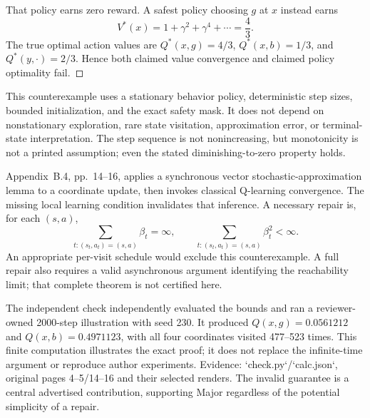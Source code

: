 \documentclass[10pt]{article}
\begin{document}
That policy earns zero reward. A safest policy choosing \(g\) at \(x\) instead earns \[V^*(x)=1+\gamma^2+\gamma^4+\cdots=\frac43.\] The true optimal action values are \(Q^*(x,g)=4/3\), \(Q^*(x,b)=1/3\), and \(Q^*(y,\cdot)=2/3\). Hence both claimed value convergence and claimed policy optimality fail. ◻\par
This counterexample uses a stationary behavior policy, deterministic step sizes, bounded initialization, and the exact safety mask. It does not depend on nonstationary exploration, rare state visitation, approximation error, or terminal-state interpretation. The step sequence is not nonincreasing, but monotonicity is not a printed assumption; even the stated diminishing-to-zero property holds.\par
Appendix B.4, pp. 14–16, applies a synchronous vector stochastic-approximation lemma to a coordinate update, then invokes classical Q-learning convergence. The missing local learning condition invalidates that inference. A necessary repair is, for each \((s,a)\), \[\sum_{t:(s_t,a_t)=(s,a)}\beta_t=\infty,
 \qquad
 \sum_{t:(s_t,a_t)=(s,a)}\beta_t^2<\infty.\] An appropriate per-visit schedule would exclude this counterexample. A full repair also requires a valid asynchronous argument identifying the reachability limit; that complete theorem is not certified here.\par
The independent check independently evaluated the bounds and ran a reviewer-owned 2000-step illustration with seed 230. It produced \(Q(x,g)=0.0561212\) and \(Q(x,b)=0.4971123\), with all four coordinates visited 477–523 times. This finite computation illustrates the exact proof; it does not replace the infinite-time argument or reproduce author experiments. Evidence: `check.py`/`calc.json`, original pages 4–5/14–16 and their selected renders. The invalid guarantee is a central advertised contribution, supporting Major regardless of the potential simplicity of a repair.\par
\end{document}
